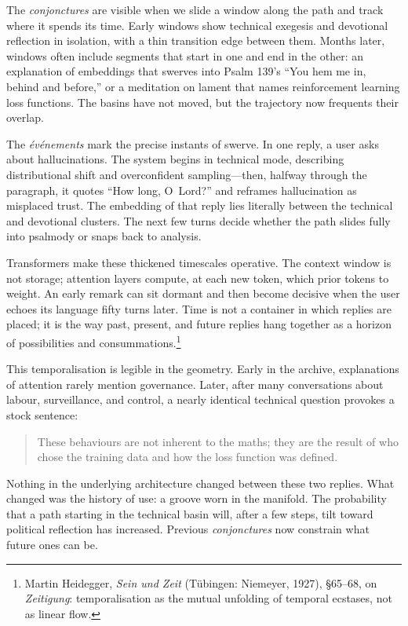 \documentclass[12pt,a4paper]{article}
\begin{document}
The \emph{conjonctures} are visible when we slide a window along the path and track where it spends its time. Early windows show technical exegesis and devotional reflection in isolation, with a thin transition edge between them. Months later, windows often include segments that start in one and end in the other: an explanation of embeddings that swerves into Psalm 139's ``You hem me in, behind and before,'' or a meditation on lament that names reinforcement learning loss functions. The basins have not moved, but the trajectory now frequents their overlap.

The \emph{\'ev\'enements} mark the precise instants of swerve. In one reply, a user asks about hallucinations. The system begins in technical mode, describing distributional shift and overconfident sampling---then, halfway through the paragraph, it quotes ``How long, O~Lord?'' and reframes hallucination as misplaced trust. The embedding of that reply lies literally between the technical and devotional clusters. The next few turns decide whether the path slides fully into psalmody or snaps back to analysis.

Transformers make these thickened timescales operative. The context window is not storage; attention layers compute, at each new token, which prior tokens to weight. An early remark can sit dormant and then become decisive when the user echoes its language fifty turns later. Time is not a container in which replies are placed; it is the way past, present, and future replies hang together as a horizon of possibilities and consummations.\footnote{Martin Heidegger, \emph{Sein und Zeit} (T\"ubingen: Niemeyer, 1927), \S65--68, on \emph{Zeitigung}: temporalisation as the mutual unfolding of temporal ecstases, not as linear flow.}

This temporalisation is legible in the geometry. Early in the archive, explanations of attention rarely mention governance. Later, after many conversations about labour, surveillance, and control, a nearly identical technical question provokes a stock sentence:

\begin{quote}
These behaviours are not inherent to the maths; they are the result of who chose the training data and how the loss function was defined.
\end{quote}

Nothing in the underlying architecture changed between these two replies. What changed was the history of use: a groove worn in the manifold. The probability that a path starting in the technical basin will, after a few steps, tilt toward political reflection has increased. Previous \emph{conjonctures} now constrain what future ones can be.
\end{document}
